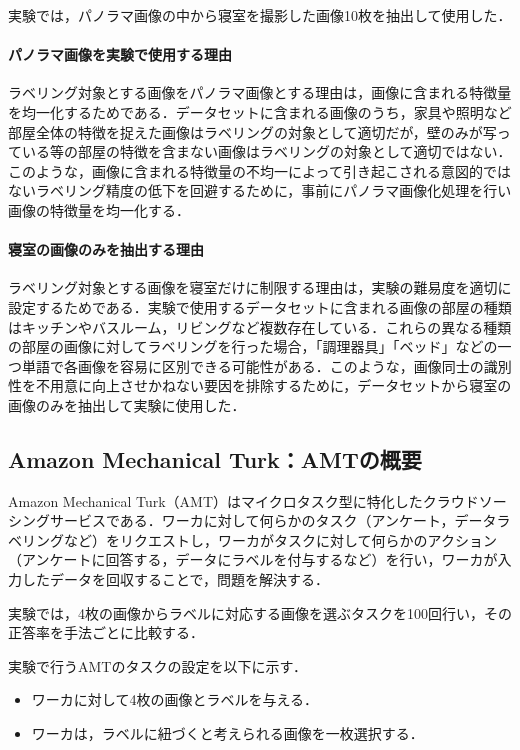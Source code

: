 \documentclass[a4paper,11pt]{jreport}
\begin{document}
実験では，パノラマ画像の中から寝室を撮影した画像10枚を抽出して使用した．

\paragraph{パノラマ画像を実験で使用する理由}
ラベリング対象とする画像をパノラマ画像とする理由は，画像に含まれる特徴量を均一化するためである．データセットに含まれる画像のうち，家具や照明など部屋全体の特徴を捉えた画像はラベリングの対象として適切だが，壁のみが写っている等の部屋の特徴を含まない画像はラベリングの対象として適切ではない．このような，画像に含まれる特徴量の不均一によって引き起こされる意図的ではないラベリング精度の低下を回避するために，事前にパノラマ画像化処理を行い画像の特徴量を均一化する．

\paragraph{寝室の画像のみを抽出する理由}
ラベリング対象とする画像を寝室だけに制限する理由は，実験の難易度を適切に設定するためである．実験で使用するデータセットに含まれる画像の部屋の種類はキッチンやバスルーム，リビングなど複数存在している．これらの異なる種類の部屋の画像に対してラベリングを行った場合，「調理器具」「ベッド」などの一つ単語で各画像を容易に区別できる可能性がある．このような，画像同士の識別性を不用意に向上させかねない要因を排除するために，データセットから寝室の画像のみを抽出して実験に使用した．

\subsection{Amazon Mechanical Turk：AMTの概要}

Amazon Mechanical Turk（AMT）はマイクロタスク型に特化したクラウドソーシングサービスである．ワーカに対して何らかのタスク（アンケート，データラベリングなど）をリクエストし，ワーカがタスクに対して何らかのアクション（アンケートに回答する，データにラベルを付与するなど）を行い，ワーカが入力したデータを回収することで，問題を解決する．

実験では，4枚の画像からラベルに対応する画像を選ぶタスクを100回行い，その正答率を手法ごとに比較する．

実験で行うAMTのタスクの設定を以下に示す．

\begin{itemize}
  \item ワーカに対して4枚の画像とラベルを与える．
  \item ワーカは，ラベルに紐づくと考えられる画像を一枚選択する．
\end{itemize}
\end{document}
